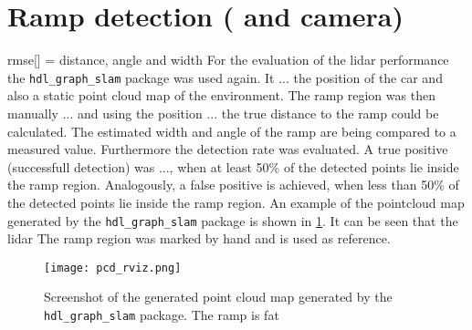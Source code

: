 \section{Ramp detection ( and camera)}
rmse[] = distance, angle and width
For the evaluation of the \gls{lidar} performance the \texttt{hdl\_graph\_slam} package was used again.
It ... the position of the car and also a static point cloud map of the environment.
The ramp region was then manually ... and using the position ... the true distance to the ramp could be calculated.
The estimated width and angle of the ramp are being compared to a measured value.
Furthermore the detection rate was evaluated.
A true positive (successfull detection) was ..., when at least 50\% of the detected points lie inside the ramp region.
Analogously, a false positive is achieved, when less than 50\% of the detected points lie inside the ramp region.
An example of the pointcloud map generated by the \texttt{hdl\_graph\_slam} package is shown in \cref{fig:pcd_rviz}.
It can be seen that the \gls{lidar}
The ramp region was marked by hand and is used as reference.
\begin{figure}[htbp]
	\centering
	\texttt{[image: pcd\_rviz.png]}
	\caption{Screenshot of the generated point cloud map generated by the \texttt{hdl\_graph\_slam} package. The ramp is fat}
	\label{fig:pcd_rviz}
\end{figure}
